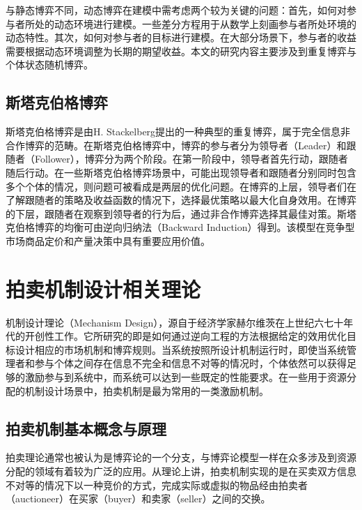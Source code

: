与静态博弈不同，动态博弈在建模中需考虑两个较为关键的问题：首先，如何对参与者所处的动态环境进行建模。一些差分方程用于从数学上刻画参与者所处环境的动态特性。其次，如何对参与者的目标进行建模。在大部分场景下，参与者的收益需要根据动态环境调整为长期的期望收益。本文的研究内容主要涉及到重复博弈与个体状态随机博弈。

\subsection{斯塔克伯格博弈}
斯塔克伯格博弈是由H. Stackelberg提出的一种典型的重复博弈，属于完全信息非合作博弈的范畴。在斯塔克伯格博弈中，博弈的参与者分为领导者（Leader）和跟随者（Follower），博弈分为两个阶段。在第一阶段中，领导者首先行动，跟随者随后行动。在一些斯塔克伯格博弈场景中，可能出现领导者和跟随者分别同时包含多个个体的情况，则问题可被看成是两层的优化问题。在博弈的上层，领导者们在了解跟随者的策略及收益函数的情况下，选择最优策略以最大化自身效用。在博弈的下层，跟随者在观察到领导者的行为后，通过非合作博弈选择其最佳对策。斯塔克伯格博弈的均衡可由逆向归纳法（Backward Induction）得到。该模型在竞争型市场商品定价和产量决策中具有重要应用价值。

%
%
%


\section{拍卖机制设计相关理论}\label{sec:mech}

机制设计理论（Mechanism Design），源自于经济学家赫尔维茨在上世纪六七十年代的开创性工作。它所研究的即是如何通过逆向工程的方法根据给定的效用优化目标设计相应的市场机制和博弈规则。当系统按照所设计机制运行时，即使当系统管理者和参与个体之间存在信息不完全和信息不对等的情况时，个体依然可以获得足够的激励参与到系统中，而系统可以达到一些既定的性能要求。在一些用于资源分配的机制设计场景中，拍卖机制是最为常用的一类激励机制。

\subsection{拍卖机制基本概念与原理}
拍卖理论通常也被认为是博弈论的一个分支，与博弈论模型一样在众多涉及到资源分配的领域有着较为广泛的应用。从理论上讲，拍卖机制实现的是在买卖双方信息不对等的情况下以一种竞价的方式，完成实际或虚拟的物品经由拍卖者（auctioneer）在买家（buyer）和卖家（seller）之间的交换。

